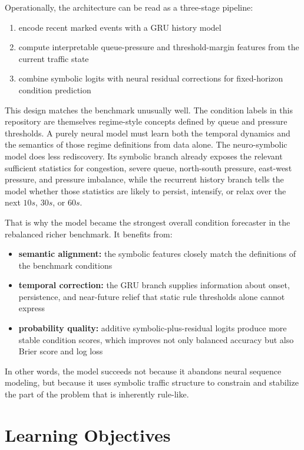 \documentclass[11pt]{article}
\begin{document}
Operationally, the architecture can be read as a three-stage pipeline:
\begin{enumerate}
  \item encode recent marked events with a GRU history model
  \item compute interpretable queue-pressure and threshold-margin features from the current traffic state
  \item combine symbolic logits with neural residual corrections for fixed-horizon condition prediction
\end{enumerate}

This design matches the benchmark unusually well. The condition labels in this repository are themselves regime-style concepts defined by queue and pressure thresholds. A purely neural model must learn both the temporal dynamics and the semantics of those regime definitions from data alone. The neuro-symbolic model does less rediscovery. Its symbolic branch already exposes the relevant sufficient statistics for congestion, severe queue, north-south pressure, east-west pressure, and pressure imbalance, while the recurrent history branch tells the model whether those statistics are likely to persist, intensify, or relax over the next \(10s\), \(30s\), or \(60s\).

That is why the model became the strongest overall condition forecaster in the rebalanced richer benchmark. It benefits from:
\begin{itemize}
  \item \textbf{semantic alignment:} the symbolic features closely match the definitions of the benchmark conditions
  \item \textbf{temporal correction:} the GRU branch supplies information about onset, persistence, and near-future relief that static rule thresholds alone cannot express
  \item \textbf{probability quality:} additive symbolic-plus-residual logits produce more stable condition scores, which improves not only balanced accuracy but also Brier score and log loss
\end{itemize}

In other words, the model succeeds not because it abandons neural sequence modeling, but because it uses symbolic traffic structure to constrain and stabilize the part of the problem that is inherently rule-like.

\section{Learning Objectives}
\end{document}
